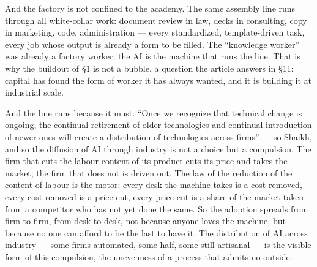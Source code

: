 \documentclass[11pt]{article}
\begin{document}
And the factory is not confined to the academy. The same assembly line
runs through all white-collar work: document review in law, decks in
consulting, copy in marketing, code, administration --- every
standardized, template-driven task, every job whose output is already a
form to be filled. The ``knowledge worker'' was already a factory
worker; the AI is the machine that runs the line. That is why the
buildout of \S 1 is not a bubble, a question the article answers in
\S 11: capital has found the form of worker it has always wanted, and
it is building it at industrial scale.

And the line runs because it must. \enquote{Once we recognize that
technical change is ongoing, the continual retirement of older
technologies and continual introduction of newer ones will create a
distribution of technologies across firms} --- so Shaikh, and so the
diffusion of AI through industry is not a choice but a compulsion. The
firm that cuts the labour content of its product cuts its price and
takes the market; the firm that does not is driven out. The law of the
reduction of the content of labour is the motor: every desk the machine
takes is a cost removed, every cost removed is a price cut, every price
cut is a share of the market taken from a competitor who has not yet
done the same. So the adoption spreads from firm to firm, from desk to
desk, not because anyone loves the machine, but because no one can
afford to be the last to have it. The distribution of AI across
industry --- some firms automated, some half, some still artisanal ---
is the visible form of this compulsion, the unevenness of a process
that admits no outside.
\end{document}
